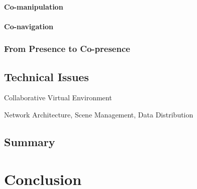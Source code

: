 \paragraph{Co-manipulation}
\paragraph{Co-navigation}

\subsubsection{From Presence to Co-presence}



\subsection{Technical Issues}
Collaborative Virtual Environment

Network Architecture, Scene Management, Data Distribution

\subsection{Summary}


\section{Conclusion}

